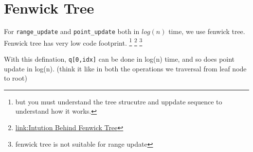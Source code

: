 \chapter{Fenwick Tree}\label{chp:fenwick_tree}

For \verb|range_update| and \verb|point_update| both in $log(n)$ time, we use fenwick tree.
Fenwick tree has very low code footprint. \footnote{but you must understand the tree strucutre and uppdate sequence to understand how it works.}
\footnote{
\href{https://cs.stackexchange.com/questions/10538/bit-what-is-the-intuition-behind-a-binary-indexed-tree-and-how-was-it-thought-a}{link:Intution Behind Fenwick Tree}}
\footnote{fenwick tree is not suitable for range update}

With this defination, \verb|q[0,idx]| can be done in log(n) time, and so does point update in log(n). (think it like in both the operations we traversal from leaf node to root)
\newpage



      



